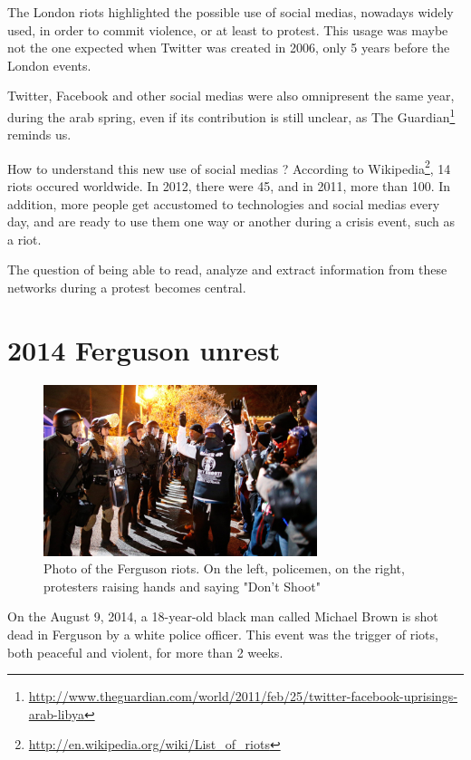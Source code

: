 \documentclass[a4paper,12pt]{report}
\begin{document}
The London riots highlighted the possible use of social medias, nowadays widely used, in order to commit violence, or at least to protest. This usage was maybe not the one expected when Twitter was created in 2006, only 5 years before the London events.

Twitter, Facebook and other social medias were also omnipresent the same year, during the arab spring, even if its contribution is still unclear, as The Guardian\footnote{\url{http://www.theguardian.com/world/2011/feb/25/twitter-facebook-uprisings-arab-libya}} reminds us.

How to understand this new use of social medias ? According to Wikipedia\footnote{\url{http://en.wikipedia.org/wiki/List_of_riots}}, 14 riots occured worldwide. In 2012, there were 45, and in 2011, more than 100. In addition, more people get accustomed to technologies and social medias every day, and are ready to use them one way or another during a crisis event, such as a riot. 

The question of being able to read, analyze and extract information from these networks during a protest becomes central.

\section{2014 Ferguson unrest}

\begin{figure}
\vspace{-0.5cm}
\centering
\includegraphics[width=8cm]{images/photos/ferguson_riots.jpg}
\caption{Photo of the Ferguson riots. On the left, policemen, on the right, protesters raising hands and saying "Don't Shoot"}
\end{figure}

On the August 9, 2014, a 18-year-old black man called Michael Brown is shot dead in Ferguson by a white police officer. This event was the trigger of riots, both peaceful and violent, for more than 2 weeks. 
\end{document}

